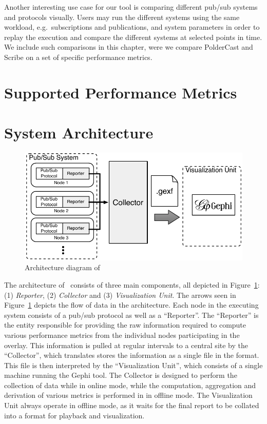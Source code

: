 Another interesting use case for our tool is comparing different pub/sub systems and
protocols visually. Users may run the different systems using the same
workload, e.g.\ subscriptions and publications, and system parameters in
order to replay the execution and compare the different systems at
selected points in time. We include such comparisons in this chapter,
were we compare PolderCast and Scribe on a set of specific performance
metrics.

\section{Supported Performance Metrics}
\label{sec:metrics}



\section{System Architecture}
\label{sec:arch}

\begin{figure}[h]
\centering
\includegraphics[width=\linewidth]{figures/arch}
\caption{Architecture diagram of \demo}
\label{fig:arch}
\end{figure}

The architecture of \demo~consists of three main components, all
depicted in Figure~\ref{fig:arch}: (1) \emph{Reporter}, (2)
\emph{Collector} and (3) \emph{Visualization Unit}.  The arrows seen in
Figure~\ref{fig:arch} depicts the flow of data in the architecture.
Each node in the executing system consists of a pub/sub protocol as well
as a ``Reporter''. The ``Reporter'' is the entity responsible for
providing the raw information required to compute various performance
metrics from the individual nodes participating in the overlay. This
information is pulled at regular intervals to a central site by the
``Collector'', which translates stores the information as a single
file in the \gexf format. This file is then interpreted by the
``Visualization Unit'', which consists of a single machine running
the Gephi tool. The Collector is designed to perform the collection of
data while in online mode, while the computation, aggregation and
derivation of various metrics is performed in in offline mode. The
Visualization Unit always operate in offline mode, as it waits for the
final report to be collated into a \gexf format for playback and
visualization.

